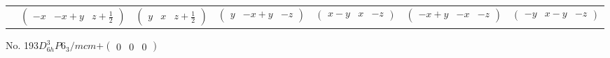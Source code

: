\documentclass[fleqn,9pt,landscape]{jsarticle}
\begin{document}
\begin{center}
\begin{longtable}{ccccccc}
& $ \begin{pmatrix} - x & - x + y & z + \frac{1}{2} \end{pmatrix} $ & $ \begin{pmatrix} y & x & z + \frac{1}{2} \end{pmatrix} $ & $ \begin{pmatrix} y & - x + y & - z \end{pmatrix} $ & $ \begin{pmatrix} x - y & x & - z \end{pmatrix} $ & $ \begin{pmatrix} - x + y & - x & - z \end{pmatrix} $ & $ \begin{pmatrix} - y & x - y & - z \end{pmatrix} $ \\
\end{longtable}
\end{center}
\newpage
No. 193\quad$D_{6h}^{3}$\quad$P6_3/mcm$\quad[ hexagonal ]\quad$+\begin{pmatrix} 0 & 0 & 0 \end{pmatrix}$
\end{document}
